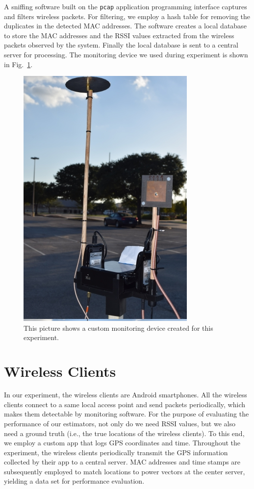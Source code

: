 A sniffing software built on the \texttt{pcap} application programming interface captures and filters wireless packets.
For filtering, we employ a hash table for removing the duplicates in the detected MAC addresses. 
The software creates a local database to store the MAC addresses and the RSSI values extracted from the wireless packets observed by the system.
Finally the local database is sent to a central server for processing.
The monitoring device we used during experiment is shown in Fig.~\ref{figure:Device}.
\begin{figure}
	\centering
	\includegraphics[scale=0.5]{Figures/DeviceSetup.jpg}
	\caption{This picture shows a custom monitoring device created for this experiment.}
	\label{figure:Device}
\end{figure}


\section{Wireless Clients}

In our experiment, the wireless clients are Android{\texttrademark} smartphones.
All the wireless clients connect to a same local access point and send packets periodically, which makes them detectable by monitoring software.
For the purpose of evaluating the performance of our estimators, not only do we need RSSI values, but we also need a ground truth (i.e., the true locations of the wireless clients).
To this end, we employ a custom app that logs GPS coordinates and time.
Throughout the experiment, the wireless clients periodically transmit the GPS information collected by their app to a central server.
MAC addresses and time stamps are subsequently employed to match locations to power vectors at the center server, yielding a data set for performance evaluation.


